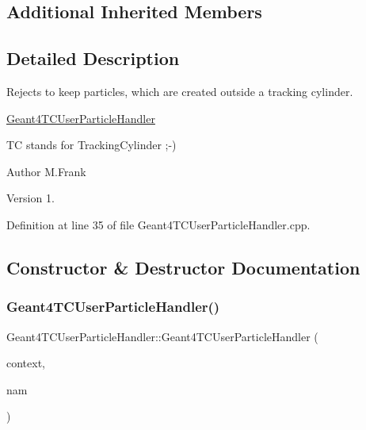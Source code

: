 \subsection*{Additional Inherited Members}


\subsection{Detailed Description}
Rejects to keep particles, which are created outside a tracking cylinder. 

\hyperlink{class_d_d4hep_1_1_simulation_1_1_geant4_t_c_user_particle_handler}{Geant4\+T\+C\+User\+Particle\+Handler}

TC stands for Tracking\+Cylinder ;-\/)

\begin{DoxyAuthor}{Author}
M.\+Frank 
\end{DoxyAuthor}
\begin{DoxyVersion}{Version}
1. 
\end{DoxyVersion}


Definition at line 35 of file Geant4\+T\+C\+User\+Particle\+Handler.\+cpp.



\subsection{Constructor \& Destructor Documentation}
\hypertarget{class_d_d4hep_1_1_simulation_1_1_geant4_t_c_user_particle_handler_ab791641fc330c58512a0becaece51142}{}\label{class_d_d4hep_1_1_simulation_1_1_geant4_t_c_user_particle_handler_ab791641fc330c58512a0becaece51142} 
\subsubsection{\texorpdfstring{Geant4\+T\+C\+User\+Particle\+Handler()}{Geant4TCUserParticleHandler()}}
{\footnotesize\ttfamily Geant4\+T\+C\+User\+Particle\+Handler\+::\+Geant4\+T\+C\+User\+Particle\+Handler (\begin{DoxyParamCaption}\item[{\hyperlink{class_d_d4hep_1_1_simulation_1_1_geant4_context}{Geant4\+Context} $\ast$}]{context,  }\item[{const std\+::string \&}]{nam }\end{DoxyParamCaption})}



